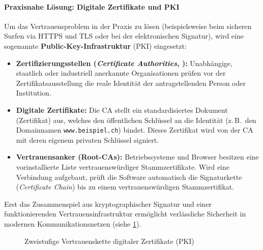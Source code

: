 \paragraph*{Praxisnahe Lösung: Digitale Zertifikate und \texorpdfstring{\acrshort{PKI}}{PKI}}
Um das Vertrauensproblem in der Praxis zu lösen (beispielsweise beim sicheren Surfen via \gls{HTTPS} und \gls{TLS} oder bei der elektronischen Signatur), wird eine sogenannte \textbf{Public-Key-Infrastruktur} (\gls{PKI}) eingesetzt:
\begin{itemize}
	\item \textbf{Zertifizierungsstellen (\emph{Certificate Authorities}, ):} Unabhängige, staatlich oder industriell anerkannte Organisationen prüfen vor der Zertifikatsausstellung die reale Identität der antragstellenden Person oder Institution.
	\item \textbf{Digitale Zertifikate:} Die \gls{CA} stellt ein standardisiertes Dokument (Zertifikat) aus, welches den öffentlichen Schlüssel an die Identität (z.\,B.\ den Domainnamen \texttt{www.beispiel.ch}) bindet. Dieses Zertifikat wird von der \gls{CA} mit deren eigenem privaten Schlüssel signiert.
	\item \textbf{Vertrauensanker (Root-\glspl{CA}):} Betriebssysteme und Browser besitzen eine vorinstallierte Liste vertrauenswürdiger Stammzertifikate. Wird eine Verbindung aufgebaut, prüft die Software automatisch die Signaturkette (\emph{Certificate Chain}) bis zu einem vertrauenswürdigen Stammzertifikat.
\end{itemize}
Erst das Zusammenspiel aus kryptographischer Signatur und einer funktionierenden Vertrauensinfrastruktur ermöglicht verlässliche Sicherheit in modernen Kommunikationsnetzen (siehe \cref{fig:pki-ablauf}).

\begin{figure}[H]
	\centering
	
	\caption{Zweistufige Vertrauenskette digitaler Zertifikate (\acrshort{PKI})}
	\label{fig:pki-ablauf}
\end{figure}

